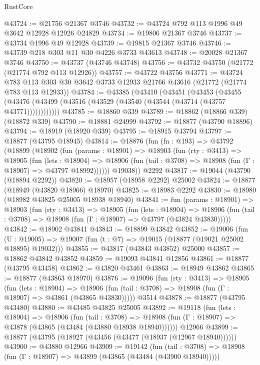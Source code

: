 \begin{lexlean}{RustCore}
\begin{coremodule}
@43724 := @21756 @21367 @3746
@43732 := @43724 @792 @113 @1996 @49 @3642 @12928 @12926 @24829
@43734 := @19806 @21367 @3746
@43737 := @43734 @1996 @49 @12928
@43739 := @19815 @21367 @3746
@43746 := @43739 @218 @303 @11 @30 @4226 @3733 @43613
@43748 := @20028 @21367 @3746
@43750 := @43737 (@43746 @43748)
@43756 := @43732 @43750 (@21772 (@21774 @792 @113 @12926))
@43757 := @43722 @43756
@43771 := @43724
    @783
    @113
    @303
    @30
    @3642
    @3733
    @12933
    @21766
    @43616
    (@21772 (@21774 @783 @113 @12933))
@43784 := @43385
    (@43410
      (@43451
        (@43453
          (@43455 (@43476 (@43499 (@43516 (@43529 (@43540 (@43544 (@43714 (@43757 @43771))))))))))))
@43785 := @18860 @339
@43789 := @18862 (@18866 @339) (@18872 @339)
@43790 := @18881 @24999
@43792 := @18877 (@43790 @18896)
@43794 := @18919 (@18920 @339)
@43795 := @18915 @43794
@43797 := @18877 (@43795 @18945)
@43814 := @18876
    (fun (fn : @193) =>
    @43792
      (@18899
        (@18902
          (fun (params : @18901) =>
          @18903
            (fun (rty : @3413) =>
            @18905
              (fun (lets : @18904) =>
              @18906 (fun (tail : @3708) => @18908 (fun (Γ : @18907) => @43797 @18992))))))
        @19038))
    @2292
@43817 := @19044 (@43790 (@18894 @2292))
@43820 := @18957 (@18958 @2292) @25002
@43824 := @18877 (@18949 (@43820 @18966) @18970)
@43825 := @18983 @2292
@43830 := @18980 (@18982 @43825 @25005 @18938 @18940)
@43841 := fun (params : @18901) =>
  @18903
    (fun (rty : @3413) =>
    @18905
      (fun (lets : @18904) =>
      @18906 (fun (tail : @3708) => @18908 (fun (Γ : @18907) => @43797 (@43824 @43830)))))
@43842 := @18902 @43841
@43843 := @18899 @43842
@43852 := @19006
    (fun (U : @19005) => @19007 (fun (t : @7) => @19015 (@18877 (@19021 @25002 @18895) @19032)))
@43855 := @43817 (@43843 @43852) @25000
@43857 := @18862 @43842 @43852
@43859 := @19093 @43841 @12856
@43861 := @18877 (@43795 @43458)
@43862 := @43820 @43461
@43863 := @18949 @43862
@43865 := @18877 (@43863 @18970)
@43876 := @19096
    (fun (rty : @3413) =>
    @18905
      (fun (lets : @18904) =>
      @18906 (fun (tail : @3708) => @18908 (fun (Γ : @18907) => @43861 (@43865 @43830)))))
    @3514
@43878 := @18877 (@43795 @43480)
@43880 := @43485 @43825 @25005
@43892 := @19118
    (fun (lets : @18904) =>
    @18906
      (fun (tail : @3708) =>
      @18908 (fun (Γ : @18907) => @43878 (@43865 (@43484 (@43880 @18938 @18940))))))
    @12966
@43899 := @18877 (@43795 (@18927 (@43456 (@43477 (@18937 (@12967 @18940))))))
@43900 := @43880 @12966
@43909 := @19142
    (fun (tail : @3708) => @18908 (fun (Γ : @18907) => @43899 (@43865 (@43484 (@43900 @18940)))))

\end{coremodule}
\end{lexlean}
